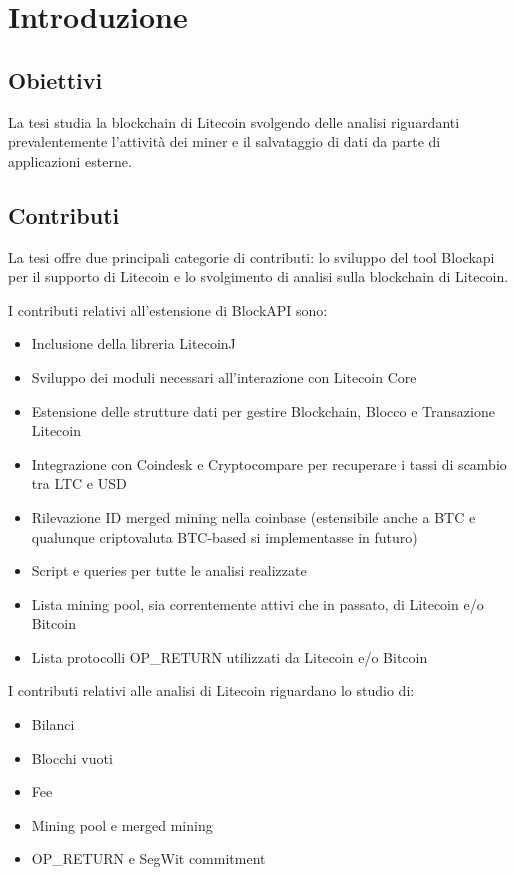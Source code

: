 \chapter{Introduzione}

\section{Obiettivi}
La tesi studia la blockchain di Litecoin svolgendo delle analisi riguardanti prevalentemente l'attività dei miner e il salvataggio di dati da parte di applicazioni esterne.

\section{Contributi}
La tesi offre due principali categorie di contributi: lo sviluppo del tool Blockapi per il supporto di Litecoin e lo svolgimento di analisi sulla blockchain di Litecoin.

I contributi relativi all'estensione di BlockAPI sono:
\begin{itemize}
	\item Inclusione della libreria LitecoinJ
	\item Sviluppo dei moduli necessari all'interazione con Litecoin Core
	\item Estensione delle strutture dati per gestire Blockchain, Blocco e Transazione Litecoin
	\item Integrazione con Coindesk e Cryptocompare per recuperare i tassi di scambio tra LTC e USD
	\item Rilevazione ID merged mining nella coinbase (estensibile anche a BTC e qualunque criptovaluta BTC-based si implementasse in futuro)
	\item Script e queries per tutte le analisi realizzate
	\item Lista mining pool, sia correntemente attivi che in passato, di Litecoin e/o Bitcoin
	\item Lista protocolli OP\_RETURN utilizzati da Litecoin e/o Bitcoin
\end{itemize}

I contributi relativi alle analisi di Litecoin riguardano lo studio di:
\begin{itemize}
	\item Bilanci
	\item Blocchi vuoti
	\item Fee
	\item Mining pool e merged mining
	\item OP\_RETURN e SegWit commitment
\end{itemize}





